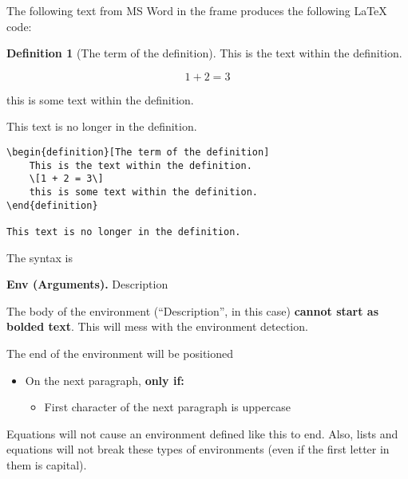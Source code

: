 \documentclass[
]{article}
\theoremstyle{plain}
\theoremstyle{remark}
\theoremstyle{definition}
\newtheorem{definition}{Definition}[section]  %
\begin{document}
The following text from MS Word in the frame produces the following
LaTeX code:

\begin{framed}

\begin{definition}[The term of the definition]
This is the text
within the definition.

\[1 + 2 = 3\]

this is some text within the definition.
\end{definition}

This text is no longer in the definition.

\end{framed}



\begin{verbatim}
\begin{definition}[The term of the definition]
    This is the text within the definition.
    \[1 + 2 = 3\]
    this is some text within the definition.
\end{definition}

This text is no longer in the definition.
\end{verbatim}

The syntax is

\begin{framed}

\textbf{Env (Arguments).} Description

\end{framed}



The body of the environment (``Description'', in this case)
\textbf{cannot start as bolded text}. This will mess with the
environment detection.

The end of the environment will be positioned

\begin{itemize}
\item
  On the next paragraph, \textbf{only if:}

  \begin{itemize}
  \item
    First character of the next paragraph is uppercase
  \end{itemize}
\end{itemize}

Equations will not cause an environment defined like this to end. Also,
lists and equations will not break these types of environments (even if
the first letter in them is capital).
\end{document}
